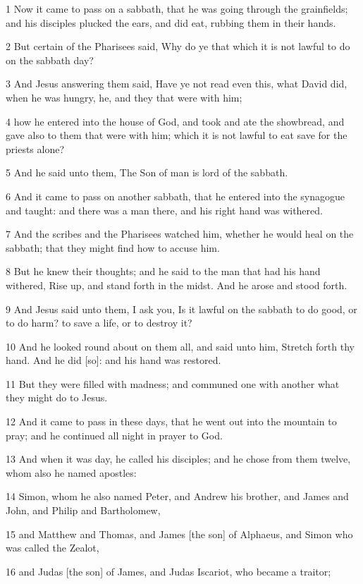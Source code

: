 \par 1 Now it came to pass on a sabbath, that he was going through the grainfields; and his disciples plucked the ears, and did eat, rubbing them in their hands.
\par 2 But certain of the Pharisees said, Why do ye that which it is not lawful to do on the sabbath day?
\par 3 And Jesus answering them said, Have ye not read even this, what David did, when he was hungry, he, and they that were with him;
\par 4 how he entered into the house of God, and took and ate the showbread, and gave also to them that were with him; which it is not lawful to eat save for the priests alone?
\par 5 And he said unto them, The Son of man is lord of the sabbath.
\par 6 And it came to pass on another sabbath, that he entered into the synagogue and taught: and there was a man there, and his right hand was withered.
\par 7 And the scribes and the Pharisees watched him, whether he would heal on the sabbath; that they might find how to accuse him.
\par 8 But he knew their thoughts; and he said to the man that had his hand withered, Rise up, and stand forth in the midst. And he arose and stood forth.
\par 9 And Jesus said unto them, I ask you, Is it lawful on the sabbath to do good, or to do harm? to save a life, or to destroy it?
\par 10 And he looked round about on them all, and said unto him, Stretch forth thy hand. And he did [so]: and his hand was restored.
\par 11 But they were filled with madness; and communed one with another what they might do to Jesus.
\par 12 And it came to pass in these days, that he went out into the mountain to pray; and he continued all night in prayer to God.
\par 13 And when it was day, he called his disciples; and he chose from them twelve, whom also he named apostles:
\par 14 Simon, whom he also named Peter, and Andrew his brother, and James and John, and Philip and Bartholomew,
\par 15 and Matthew and Thomas, and James [the son] of Alphaeus, and Simon who was called the Zealot,
\par 16 and Judas [the son] of James, and Judas Iscariot, who became a traitor;
